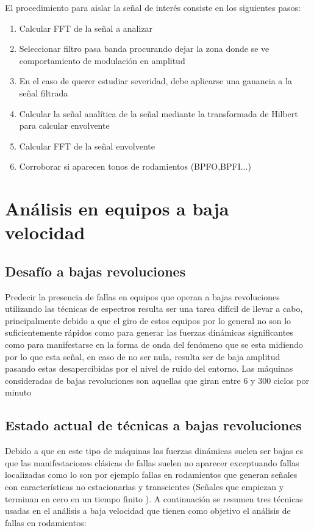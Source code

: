     		El procedimiento para aislar la señal de interés consiste en los siguientes pasos:
    		\begin{enumerate}
    			\item {Calcular FFT de la señal a analizar}
    			\item Seleccionar filtro pasa banda procurando dejar la zona donde se ve comportamiento de modulación en amplitud
    			\item En el caso de querer estudiar severidad, debe aplicarse una ganancia a la señal filtrada
    			\item Calcular la señal analítica de la señal mediante la transformada de Hilbert para calcular envolvente
    			\item Calcular FFT de la señal envolvente
    			\item Corroborar si aparecen tonos de rodamientos (BPFO,BPFI...) 
    		\end{enumerate}
		
	\section{Análisis en equipos a baja velocidad}
		\subsection{Desafío a bajas revoluciones}
		    Predecir la presencia de fallas en equipos que operan a bajas revoluciones utilizando las técnicas de espectros resulta ser una tarea difícil de llevar a cabo, principalmente debido a que el giro de estos equipos por lo general no son lo suficientemente rápidos como para generar las fuerzas dinámicas significantes como para manifestarse en la forma de onda del fenómeno que se esta midiendo por lo que esta señal, en caso de no ser nula, resulta ser de baja amplitud pasando estas desapercibidas por el nivel de ruido del entorno. Las máquinas consideradas de bajas revoluciones son aquellas que giran entre 6 y 300 ciclos por minuto \cite{robinsonjc}			
		\subsection{Estado actual de técnicas a bajas revoluciones}
		    Debido a que en este tipo de máquinas las fuerzas dinámicas suelen ser bajas es que las manifestaciones clásicas de fallas suelen no aparecer exceptuando fallas localizadas como lo son por ejemplo fallas en rodamientos que generan señales con características no estacionarias y transcientes (Señales que empiezan y terminan en cero en un tiempo finito \cite{dlinonstationary}). A continuación se resumen tres técnicas usadas en el análisis a baja velocidad que tienen como objetivo el análisis de fallas en rodamientos:
